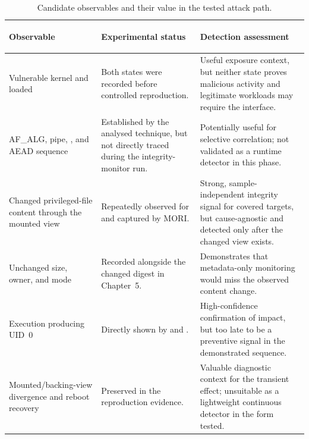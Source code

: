 \begin{table}[H]
    \centering
    \caption{Candidate observables and their value in the tested attack path.}
    \label{tab:detection-opportunities}
    \small
    \begin{tabularx}{\textwidth}{@{}>{\bfseries\raggedright\arraybackslash}p{}>{\raggedright\arraybackslash}p{}Y@{}}
        \toprule
        Observable & Experimental status & Detection assessment \\
        \midrule
        Vulnerable kernel and loaded  &
        Both states were recorded before controlled reproduction. &
        Useful exposure context, but neither state proves malicious activity
        and legitimate workloads may require the interface. \\

        AF\_ALG, pipe, , and AEAD sequence &
        Established by the analysed technique, but not directly traced during
        the integrity-monitor run. &
        Potentially useful for selective correlation; not validated as a
        runtime detector in this phase. \\

        Changed privileged-file content through the mounted view &
        Repeatedly observed for  and captured by MORI. &
        Strong, sample-independent integrity signal for covered targets, but
        cause-agnostic and detected only after the changed view exists. \\

        Unchanged size, owner, and mode &
        Recorded alongside the changed digest in Chapter~5. &
        Demonstrates that metadata-only monitoring would miss the observed
        content change. \\

        Execution producing UID~0 &
        Directly shown by  and . &
        High-confidence confirmation of impact, but too late to be a preventive
        signal in the demonstrated sequence. \\

        Mounted/backing-view divergence and reboot recovery &
        Preserved in the reproduction evidence. &
        Valuable diagnostic context for the transient effect; unsuitable as a
        lightweight continuous detector in the form tested. \\
        \bottomrule
    \end{tabularx}
\end{table}

